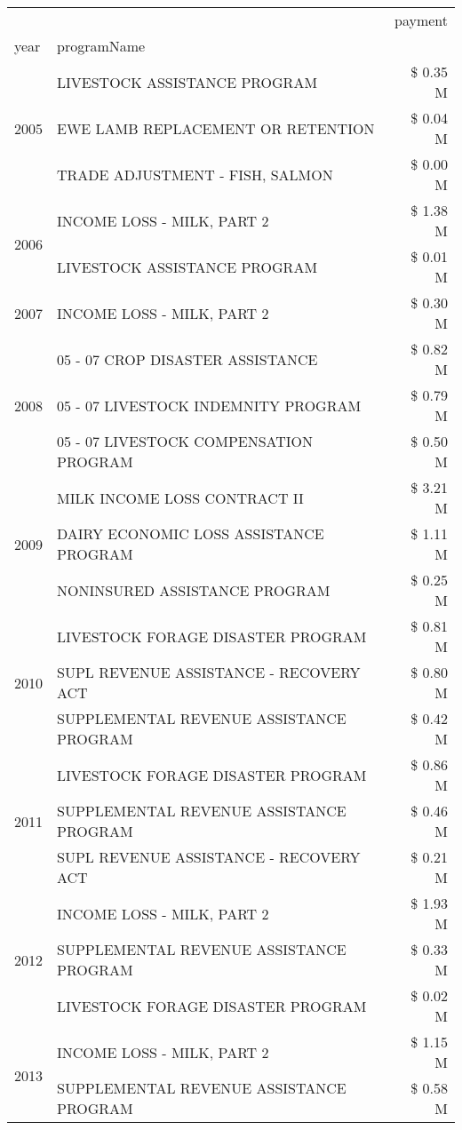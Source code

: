 \begin{tabular}{llr}
\toprule
 &  & payment \\
year & programName &  \\
\midrule
\multirow[t]{3}{*}{2005} & LIVESTOCK ASSISTANCE PROGRAM & \$ 0.35 M \\
 & EWE LAMB REPLACEMENT OR RETENTION & \$ 0.04 M \\
 & TRADE ADJUSTMENT - FISH, SALMON & \$ 0.00 M \\
\cline{1-3}
\multirow[t]{2}{*}{2006} & INCOME LOSS - MILK, PART 2 & \$ 1.38 M \\
 & LIVESTOCK ASSISTANCE PROGRAM & \$ 0.01 M \\
\cline{1-3}
2007 & INCOME LOSS - MILK, PART 2 & \$ 0.30 M \\
\cline{1-3}
\multirow[t]{3}{*}{2008} & 05 - 07 CROP DISASTER ASSISTANCE & \$ 0.82 M \\
 & 05 - 07 LIVESTOCK INDEMNITY PROGRAM & \$ 0.79 M \\
 & 05 - 07 LIVESTOCK COMPENSATION PROGRAM & \$ 0.50 M \\
\cline{1-3}
\multirow[t]{3}{*}{2009} & MILK INCOME LOSS CONTRACT II & \$ 3.21 M \\
 & DAIRY ECONOMIC LOSS ASSISTANCE PROGRAM & \$ 1.11 M \\
 & NONINSURED ASSISTANCE PROGRAM & \$ 0.25 M \\
\cline{1-3}
\multirow[t]{3}{*}{2010} & LIVESTOCK FORAGE DISASTER PROGRAM & \$ 0.81 M \\
 & SUPL REVENUE ASSISTANCE - RECOVERY ACT & \$ 0.80 M \\
 & SUPPLEMENTAL REVENUE ASSISTANCE PROGRAM & \$ 0.42 M \\
\cline{1-3}
\multirow[t]{3}{*}{2011} & LIVESTOCK FORAGE DISASTER PROGRAM & \$ 0.86 M \\
 & SUPPLEMENTAL REVENUE ASSISTANCE PROGRAM & \$ 0.46 M \\
 & SUPL REVENUE ASSISTANCE - RECOVERY ACT & \$ 0.21 M \\
\cline{1-3}
\multirow[t]{3}{*}{2012} & INCOME LOSS - MILK, PART 2 & \$ 1.93 M \\
 & SUPPLEMENTAL REVENUE ASSISTANCE PROGRAM & \$ 0.33 M \\
 & LIVESTOCK FORAGE DISASTER PROGRAM & \$ 0.02 M \\
\cline{1-3}
\multirow[t]{3}{*}{2013} & INCOME LOSS - MILK, PART 2 & \$ 1.15 M \\
 & SUPPLEMENTAL REVENUE ASSISTANCE PROGRAM & \$ 0.58 M \\

\end{tabular}
